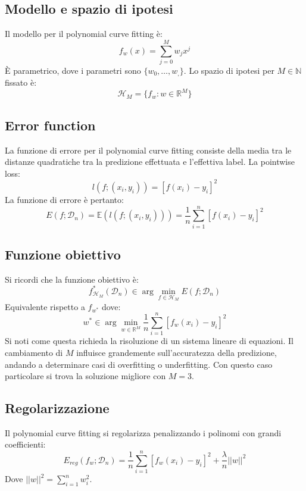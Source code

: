 	\subsection{Modello e spazio di ipotesi}
	Il modello per il polynomial curve fitting \`e:
	$$f_w(x) = \sum\limits_{j = 0}^M w_jx^j$$
	\`E parametrico, dove i parametri sono $\{w_0,\dots, w_,\}$.
	Lo spazio di ipotesi per $M\in\mathbb{N}$ fissato \`e:
	$$\mathcal{H}_M = \{f_w:w\in\mathbb{R}^M\}$$

	\subsection{Error function}
	La funzione di errore per il polynomial curve fitting consiste della media tra le distanze quadratiche tra la predizione effettuata e l'effettiva label.
	La pointwise loss:
	$$l(f;(x_i,y_i)) = [f(x_i) - y_i]^2$$
	La funzione di errore \`e pertanto:
	$$E(f;\mathcal{D}_n) = \mathbb{E}(l(f;(x_i,y_i))) = \frac{1}{n}\sum\limits_{i=1}^n[f(x_i)-y_i]^2$$

	\subsection{Funzione obiettivo}
	Si ricordi che la funzione obiettivo \`e:
	$$f^*_{\mathcal{H}_M}(\mathcal{D}_n)\in\arg\min\limits_{f\in\mathcal{H}_M}E(f;\mathcal{D}_n)$$
	Equivalente rispetto a $f_{w^*}$ dove:
	$$w^*\in\arg\min\limits_{w\in\mathbb{R}^M}\frac{1}{n}\sum\limits_{i=1}^n[f_w(x_i)-y_i]^2$$
	Si noti come questa richieda la risoluzione di un sistema lineare di equazioni.
	Il cambiamento di $M$ influisce grandemente sull'accuratezza della predizione, andando a determinare casi di overfitting o underfitting.
	Con questo caso particolare si trova la soluzione migliore con $M=3$.

	\subsection{Regolarizzazione}
	Il polynomial curve fitting si regolarizza penalizzando i polinomi con grandi coefficienti:
	$$E_{reg}(f_w;\mathcal{D}_n) = \frac{1}{n}\sum\limits_{i=1}^n[f_w(x_i)-y_i]^2 + \frac{\lambda}{n}||w||^2$$
	Dove $||w||^2 = \sum\limits_{i = 1}^n w_i^2$.
